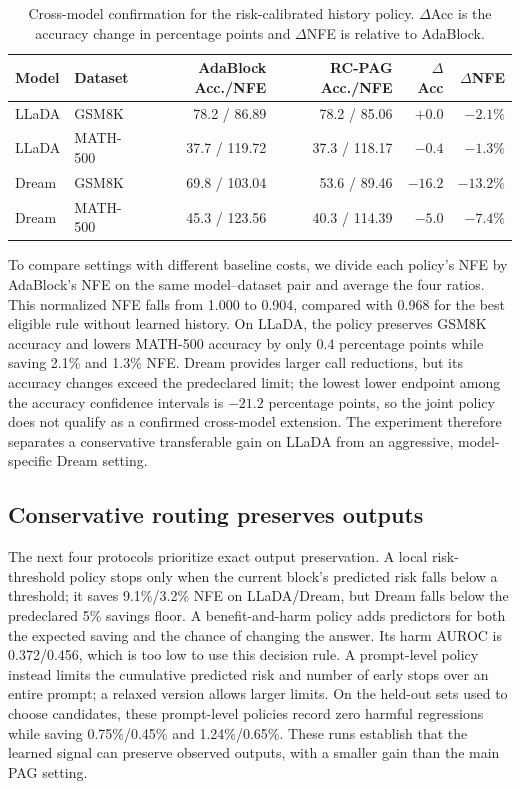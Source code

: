 \documentclass{article}
\newcommand{\rcpag}{RC-PAG}
\newcommand{\nfe}{NFE}
\begin{document}
\begin{table}[t]
  \caption{Cross-model confirmation for the risk-calibrated history policy. $\Delta$Acc is the accuracy change in percentage points and $\Delta$\nfe{} is relative to AdaBlock.}
  \label{tab:cross-model}
  \centering
  \small
  \begin{tabular}{llrrrr}
    \toprule
    Model & Dataset & AdaBlock Acc./\nfe{} & \rcpag{} Acc./\nfe{} & $\Delta$Acc & $\Delta$\nfe{} \\
    \midrule
    LLaDA & GSM8K & 78.2 / 86.89 & 78.2 / 85.06 & $+0.0$ & $-2.1\%$ \\
    LLaDA & MATH-500 & 37.7 / 119.72 & 37.3 / 118.17 & $-0.4$ & $-1.3\%$ \\
    Dream & GSM8K & 69.8 / 103.04 & 53.6 / 89.46 & $-16.2$ & $-13.2\%$ \\
    Dream & MATH-500 & 45.3 / 123.56 & 40.3 / 114.39 & $-5.0$ & $-7.4\%$ \\
    \bottomrule
  \end{tabular}
\end{table}

To compare settings with different baseline costs, we divide each policy's \nfe{} by AdaBlock's \nfe{} on the same model--dataset pair and average the four ratios. This normalized \nfe{} falls from 1.000 to 0.904, compared with 0.968 for the best eligible rule without learned history. On LLaDA, the policy preserves GSM8K accuracy and lowers MATH-500 accuracy by only 0.4 percentage points while saving 2.1\% and 1.3\% \nfe{}. Dream provides larger call reductions, but its accuracy changes exceed the predeclared limit; the lowest lower endpoint among the accuracy confidence intervals is $-21.2$ percentage points, so the joint policy does not qualify as a confirmed cross-model extension. The experiment therefore separates a conservative transferable gain on LLaDA from an aggressive, model-specific Dream setting.

\subsection{Conservative routing preserves outputs}

The next four protocols prioritize exact output preservation. A local risk-threshold policy stops only when the current block's predicted risk falls below a threshold; it saves 9.1\%/3.2\% \nfe{} on LLaDA/Dream, but Dream falls below the predeclared 5\% savings floor. A benefit-and-harm policy adds predictors for both the expected saving and the chance of changing the answer. Its harm AUROC is 0.372/0.456, which is too low to use this decision rule. A prompt-level policy instead limits the cumulative predicted risk and number of early stops over an entire prompt; a relaxed version allows larger limits. On the held-out sets used to choose candidates, these prompt-level policies record zero harmful regressions while saving 0.75\%/0.45\% and 1.24\%/0.65\%. These runs establish that the learned signal can preserve observed outputs, with a smaller gain than the main PAG setting.
\end{document}

